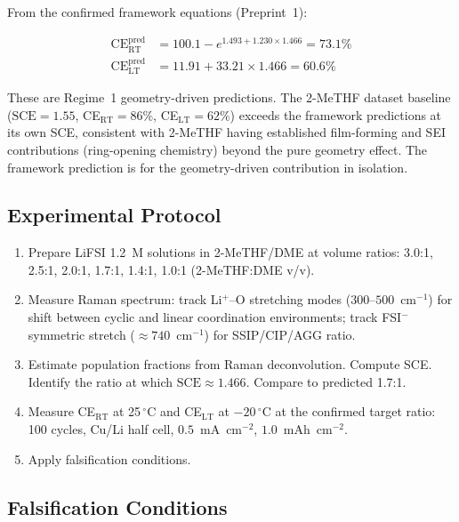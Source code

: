 \documentclass[11pt]{article}
\theoremstyle{plain}
\theoremstyle{definition}
\theoremstyle{remark}
\begin{document}
From the confirmed framework equations (Preprint~1):

\begin{align}
  \mathrm{CE}_{\mathrm{RT}}^{\mathrm{pred}}
  &= 100.1 - e^{1.493 + 1.230 \times 1.466}
   = 73.1\%
  \label{eq:C1_CE_RT}\\[6pt]
  \mathrm{CE}_{\mathrm{LT}}^{\mathrm{pred}}
  &= 11.91 + 33.21 \times 1.466
   = 60.6\%
  \label{eq:C1_CE_LT}
\end{align}

These are Regime~1 geometry-driven predictions.  The 2-MeTHF dataset
baseline ($\mathrm{SCE} = 1.55$, CE$_\mathrm{RT} = 86\%$,
CE$_\mathrm{LT} = 62\%$) exceeds the framework predictions at its
own SCE, consistent with 2-MeTHF having established film-forming and
SEI contributions (ring-opening chemistry) beyond the pure geometry
effect.  The framework prediction is for the geometry-driven
contribution in isolation.

\subsection{Experimental Protocol}

\begin{enumerate}[leftmargin=2em]
  \item Prepare LiFSI 1.2~M solutions in 2-MeTHF/DME at volume
        ratios: 3.0:1, 2.5:1, 2.0:1, 1.7:1, 1.4:1, 1.0:1
        (2-MeTHF:DME v/v).
  \item Measure Raman spectrum: track Li$^+$--O stretching modes
        ($300$--$500$~cm$^{-1}$) for shift between cyclic and
        linear coordination environments; track FSI$^-$ symmetric
        stretch ($\approx 740$~cm$^{-1}$) for SSIP/CIP/AGG ratio.
  \item Estimate population fractions from Raman deconvolution.
        Compute SCE.  Identify the ratio at which
        $\mathrm{SCE} \approx 1.466$.  Compare to predicted 1.7:1.
  \item Measure CE$_\mathrm{RT}$ at 25\,$^\circ$C and
        CE$_\mathrm{LT}$ at $-20\,^\circ$C at the confirmed target
        ratio: 100 cycles, Cu/Li half cell,
        $0.5$~mA~cm$^{-2}$, $1.0$~mAh~cm$^{-2}$.
  \item Apply falsification conditions.
\end{enumerate}

\subsection{Falsification Conditions}
\end{document}

